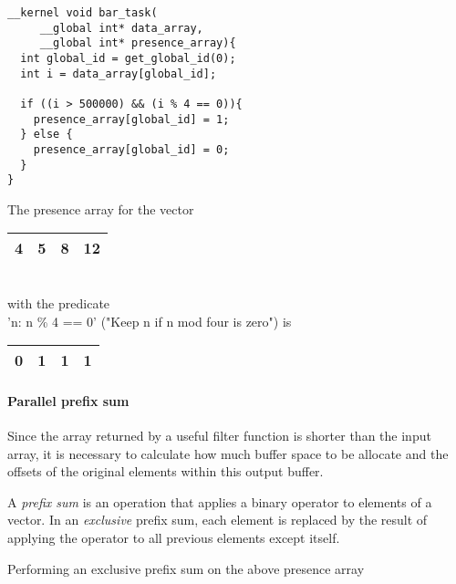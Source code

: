     \begin{verbatim}
__kernel void bar_task(
     __global int* data_array,
     __global int* presence_array){
  int global_id = get_global_id(0);
  int i = data_array[global_id];

  if ((i > 500000) && (i % 4 == 0)){
    presence_array[global_id] = 1;
  } else {
    presence_array[global_id] = 0;
  }
}
    \end{verbatim}

    The presence array for the vector
    \begin{tabular}{ | c | c | c | c |}
      \hline
        4 & 5 & 8 & 12 \\
      \hline
    \end{tabular}
    \\
    with the predicate
    \\
    'n: n \% 4 == 0' ("Keep n if n mod four is zero") is
    \\
    \begin{tabular}{ | c | c | c | c |}
      \hline
        0 & 1 & 1 & 1 \\
      \hline
    \end{tabular}

    \paragraph{Parallel prefix sum}
    Since the array returned by a useful filter function is shorter than the input array, it is necessary to calculate how much buffer space to be allocate and the offsets of the original elements within this output buffer.

    A \emph{prefix sum} is an operation that applies a binary operator to elements of a vector. In an \emph{exclusive} prefix sum, each element is replaced by the result of applying the operator to all previous elements except itself.

  Performing an exclusive prefix sum on the above presence array

